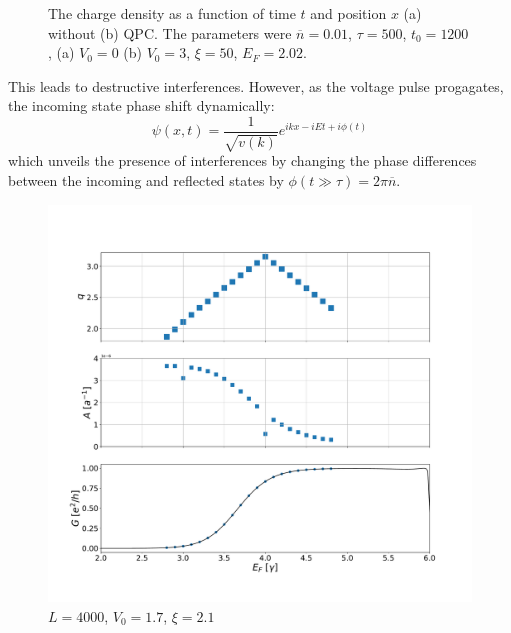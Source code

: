 \documentclass[aps,prl,preprint,groupedaddress]{revtex4-1}
\begin{document}
\begin{figure}[!h]
	\centering
	\qquad
	\caption{The charge density as a function of time $t$ and position $x$ (a) without (b) QPC. The parameters were $\overline{n} =0.01$, $\tau = 500$, $t_0 =1200$, (a) $V_0 = 0$ (b) $V_0 = 3$, $\xi = 50$, $E_F =2.02$.}
	
	\label{fig:density_comp_reflec}%
\end{figure}



This leads to destructive interferences. However, as the voltage pulse progagates, the incoming state phase shift dynamically:
\begin{equation}
\psi(x,t) =  \frac{1}{\sqrt{v(k)}} e^{ikx - iEt + i\phi(t)}
\end{equation}
which unveils the presence of interferences by changing the phase differences between the incoming and reflected states by $\phi(t\gg \tau) = 2\pi \overline{n}$.


\begin{figure}
	\centering
	\includegraphics[width=0.7\linewidth]{../figures/G_AMP_Q}
	\caption{$L =4000$, $V_0 = 1.7$, $\xi = 2.1$}
	\label{fig:gampq}
\end{figure}


\end{document}
